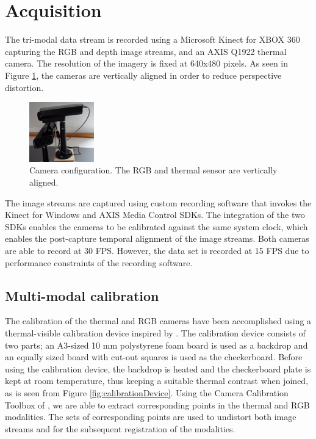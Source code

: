 \documentclass[10pt,twocolumn,letterpaper]{article}
\begin{document}
\section{Acquisition}
\label{sec:setup}
The tri-modal data stream is recorded using a Microsoft Kinect for XBOX 360 capturing the RGB and depth image streams, and an AXIS Q1922 thermal camera. The resolution of the imagery is fixed at 640x480 pixels. As seen in Figure \ref{fig:camerasetup}, the cameras are vertically aligned in order to reduce perspective distortion. 

\begin{figure}[htpb]
	\centering
		\includegraphics[width=0.25\textwidth]{pictures/camerasetup.jpg}
	\caption{Camera configuration. The RGB and thermal sensor are vertically aligned.}
	\label{fig:camerasetup}
\end{figure}

The image streams are captured using custom recording software that invokes the Kinect for Windows and AXIS Media Control SDKs. The integration of the two SDKs enables the cameras to be calibrated against the same system clock, which enables the post-capture temporal alignment of the image streams. Both cameras are able to record at 30 FPS. However, the data set is recorded at 15 FPS due to performance constraints of the recording software. 

\subsection{Multi-modal calibration}
The calibration of the thermal and RGB cameras have been accomplished using a thermal-visible calibration device inspired by \cite{vidas2012mask}. The calibration device consists of two parts; an A3-sized 10 mm polystyrene foam board is used as a backdrop and an equally sized board with cut-out squares is used as the checkerboard. Before using the calibration device, the backdrop is heated and the checkerboard plate is kept at room temperature, thus keeping a suitable thermal contrast when joined, as is seen from Figure \ref{fig:calibrationDevice}. %
Using the Camera Calibration Toolbox of \cite{bouguet2004camera}, we are able to extract corresponding points in the thermal and RGB modalities. The sets of corresponding points are used to undistort both image streams and for the subsequent registration of the modalities. 
\end{document}

